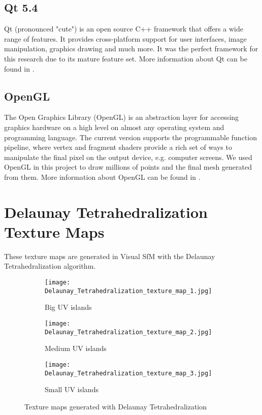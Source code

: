 \subsection{Qt 5.4}

Qt (pronounced "cute") is an open source C++ framework that offers a wide range of features. It provides cross-platform support for user interfaces, image manipulation, graphics drawing and much more. It was the perfect framework for this research due to its mature feature set. More information about Qt can be found in \parencite{appendix_qt}.

\subsection{OpenGL}

The Open Graphics Library (OpenGL) is an abstraction layer for accessing graphics hardware on a high level on almost any operating system and programming language. The current version supports the programmable function pipeline, where vertex and fragment shaders provide a rich set of ways to manipulate the final pixel on the output device, e.g. computer screens. We used OpenGL in this project to draw millions of points and the final mesh generated from them. More information about OpenGL can be found in \parencite{appendix_opengl}.

\section{Delaunay Tetrahedralization Texture Maps}
\label{appendix_delaunay_texture_maps}

These texture maps are generated in Visual SfM with the Delaunay Tetrahedralization algorithm.

\begin{figure}[h]
	\centering
	\begin{subfigure}[b]{0.3\textwidth}
		\centering
		\texttt{[image: Delaunay\_Tetrahedralization\_texture\_map\_1.jpg]}
		\caption{Big UV islands}
		\label{fig:appendix_dt_1}
	\end{subfigure}
	\hfill
	\begin{subfigure}[b]{0.3\textwidth}
		\centering
		\texttt{[image: Delaunay\_Tetrahedralization\_texture\_map\_2.jpg]}
		\caption{Medium UV islands}
		\label{fig:appendix_dt_2}
	\end{subfigure}
	\hfill
	\begin{subfigure}[b]{0.3\textwidth}
		\centering
		\texttt{[image: Delaunay\_Tetrahedralization\_texture\_map\_3.jpg]}
		\caption{Small UV islands}
		\label{fig:appendix_dt_3}
	\end{subfigure}
	\caption{Texture maps generated with Delaunay Tetrahedralization}
	\label{fig:appendix_dt}
\end{figure}
